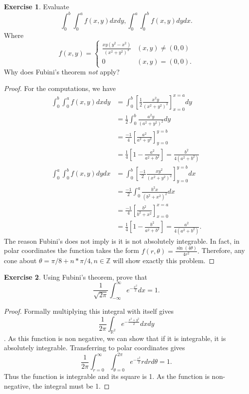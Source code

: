 \documentclass{amsart}
\theoremstyle{plain}
\theoremstyle{definition}
\newtheorem{exer}{Exercise}[section]
\newcommand{\R}{\mathbb{R}}
\newcommand{\Z}{\mathbb{Z}}
\begin{document}
\begin{exer}
    Evaluate
    $$\int_{0}^{b}\int_{0}^a f(x,y) dx dy , \int_{0}^{a}\int_{0}^{b} f(x,y) dy dx.$$
    Where 
    $$f(x,y) = \begin{cases}
        \frac{xy\left(y^2-x^2\right)}{\left(x^2+y^2\right)^3}  & (x,y) \neq (0,0)\\
        0 & (x,y) = (0,0).
    \end{cases}$$
    Why does Fubini's theorem \textit{not} apply?
\end{exer}
\begin{proof}
    For the computations, we have
    \begin{align*}
        \int_{0}^{b}\int_{0}^a f(x,y) dx dy &= \int_{0}^b \left[\frac{1}{2}\frac{x^2y}{\left(x^2+y^2\right)^2}\right]_{x=0}^{x=a} dy\\
        &= \frac{1}{2}\int_{0}^b \frac{a^2 y}{\left(a^2+y^2\right)^2} dy\\
        &= \frac{-1}{4}\left[\frac{a^2}{a^2+y^2}\right]_{y=0}^{y=b}\\
        &= \frac{1}{4}\left[1-\frac{a^2}{a^2+b^2}\right]=\frac{b^2}{4\left(a^2+b^2\right)}\\
        \int_{0}^{a}\int_{0}^b f(x,y) dy dx &= \int_{0}^b \left[\frac{-1}{2}\frac{xy^2}{\left(x^2+y^2\right)^2}\right]_{y=0}^{y=b} dx\\
        &= \frac{-1}{2}\int_{0}^a \frac{b^2 x}{\left(b^2+x^2\right)^2} dx\\
        &= \frac{-1}{4}\left[\frac{b^2}{b^2+x^2}\right]_{x=0}^{x=a}\\
        &= \frac{1}{4}\left[1-\frac{b^2}{a^2+b^2}\right]=\frac{a^2}{4\left(a^2+b^2\right)}.
    \end{align*}
    The reason Fubini's does not imply is it is not absolutely integrable. In fact, in polar coordinates the function takes the form $f(r,\theta) = \frac{\sin(4\theta)}{4r^2}.$ Therefore, any cone about $\theta=\pi/8+n*\pi/4, n\in\Z$ will show exactly this problem.
\end{proof}

\begin{exer}
    Using Fubini's theorem, prove that 
    $$\frac{1}{\sqrt{2\pi}}\int_{-\infty}^{\infty} e^{-\frac{x^2}{2}}dx = 1.$$
\end{exer}
\begin{proof}
Formally multiplying this integral with itself gives 
$$\frac{1}{2\pi}\int_{\R^2} e^{-\frac{x^2+y^2}{2}} dx dy$$.
As this function is non negative, we can show that if it is integrable, it is absolutely integrable. Transferring to polar coordinates gives
$$\frac{1}{2\pi}\int_{r=0}^{\infty}\int_{\theta=0}^{2\pi} e^{-\frac{r^2}{2}} r dr d\theta = 1.$$
Thus the function is integrable and its square is 1. As the function is non-negative, the integral must be 1.   
\end{proof}
\end{document}
